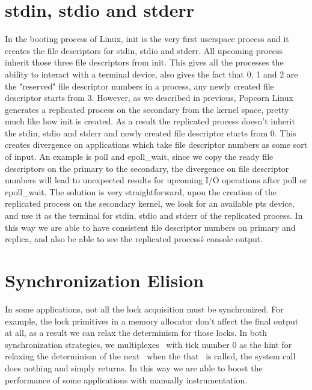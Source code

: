 \section{stdin, stdio and stderr} \label{sec:stdxxx}

In the booting process of Linux, init is the very first userspace process and it creates the file descriptors for stdin, stdio and stderr. All upcoming process inherit those three file descriptors from init. This gives all the processes the ability to interact with a terminal device, also gives the fact that 0, 1 and 2 are the "reserved" file descriptor numbers in a process, any newly created file descriptor starts from 3. However, as we described in previous, Popcorn Linux generates a replicated process on the secondary from the kernel space, pretty much like how init is created. As a result the replicated process doesn't inherit the stdin, stdio and stderr and newly created file descriptor starts from 0. This creates divergence on applications which take file descriptor numbers as some sort of input. An example is poll and epoll\_wait, since we copy the ready file descriptors on the primary to the secondary, the divergence on file descriptor numbers will lead to unexpected results for upcoming I/O operations after poll or epoll\_wait. The solution is very straightforward, upon the creation of the replicated process on the secondary kernel, we look for an available pts device, and  use it as the terminal for stdin, stdio and stderr of the replicated process. In this way we are able to have consistent file descriptor numbers on primary and replica, and also be able to see the replicated process\'s console output.

\section{Synchronization Elision} \label{sec:elision}
In some applications, not all the lock acquisition must be synchronized. For example, the lock primitives in a memory allocator don't affect the final output at all, as a result we can relax the determinism for those locks. In both synchronization strategies, we multiplexes \dettick\ with tick number 0 as the hint for relaxing the determinism of the next \detstart\, when the that \detstart\ is called, the system call does nothing and simply returns. In this way we are able to boost the performance of some applications with manually instrumentation.